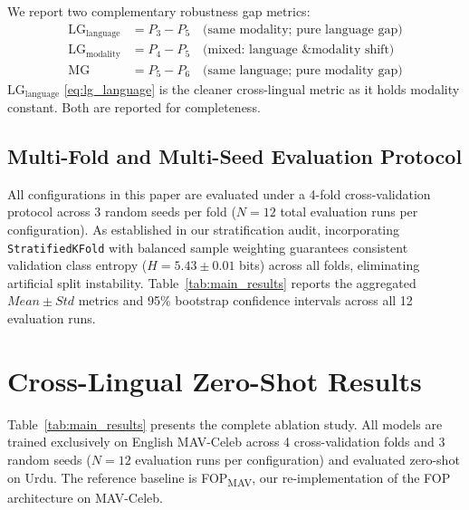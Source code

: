 \documentclass[conference]{IEEEtran}
\newcommand{\fopmav}{FOP\textsubscript{MAV}}
\begin{document}
We report two complementary robustness gap metrics:
\begin{align}
\text{LG}_{\text{language}} &= P_3 - P_5
  \quad\text{(same modality; pure language gap)} \label{eq:lg_language}\\
\text{LG}_{\text{modality}} &= P_4 - P_5
  \quad\text{(mixed: language \& modality shift)} \label{eq:lg_modality}\\
\text{MG} &= P_5 - P_6
  \quad\text{(same language; pure modality gap)} \label{eq:mg}
\end{align}
$\text{LG}_{\text{language}}$ \eqref{eq:lg_language} is the cleaner cross-lingual
metric as it holds modality constant. Both are reported for completeness.

\subsection{Multi-Fold and Multi-Seed Evaluation Protocol}

All configurations in this paper are evaluated under a 4-fold cross-validation protocol across 3 random seeds per fold ($N=12$ total evaluation runs per configuration). As established in our stratification audit, incorporating \texttt{StratifiedKFold} with balanced sample weighting guarantees consistent validation class entropy ($H = 5.43 \pm 0.01$ bits) across all folds, eliminating artificial split instability. Table~\ref{tab:main_results} reports the aggregated $Mean \pm Std$ metrics and 95\% bootstrap confidence intervals across all 12 evaluation runs.

\section{Cross-Lingual Zero-Shot Results}
\label{sec:results}

Table~\ref{tab:main_results} presents the complete ablation study.
All models are trained exclusively on English MAV-Celeb across 4 cross-validation folds and 3 random seeds ($N=12$ evaluation runs per configuration) and evaluated zero-shot on Urdu.
The reference baseline is \fopmav{}, our re-implementation of the FOP
architecture on MAV-Celeb.
\end{document}
